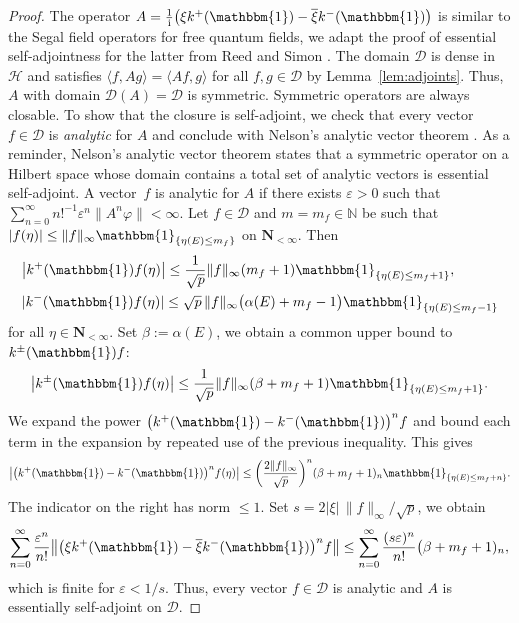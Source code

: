 \documentclass[10pt,a4paper]{amsart}
\numberwithin{equation}{section}
\newcommand{\N}{\mathbb{N}}
\newcommand{\eps}{\varepsilon}
\newcommand{\la}{\langle}
\newcommand{\ra}{\rangle}
\newcommand{\1}{\mathbbm{1}}
\begin{document}
\begin{proof}
	The operator $A = \frac{1}{\mathrm i} \bigl( \xi k^+(\1)- \overline{\xi} k^-(\1)\bigr)$ is similar to the Segal field operators for free quantum fields, we adapt the proof of essential self-adjointness for the latter from Reed and Simon \cite[Theorem X.41\,(a)]{reedSimonII}.
	The domain $\mathcal D$ is dense in $\mathcal H$ and satisfies $\la f, A g\ra = \la Af, g\ra$ for all $f,g\in \mathcal D$ by Lemma~\ref{lem:adjoints}. Thus, $A$ with domain $\mathcal D(A) = \mathcal D$ is symmetric. Symmetric operators are always closable. 	
	To show that the closure is self-adjoint, we check that every vector $f\in \mathcal D$ is \emph{analytic} for $A$ and conclude with Nelson's analytic vector theorem \cite[Theorem~X.39]{reedSimonII}.
 As a reminder, Nelson's analytic vector theorem states that a symmetric operator on a Hilbert space whose domain contains a total set of analytic vectors is essential self-adjoint.
 A vector~$f$ is analytic for $A$ if there exists $\eps>0$ such that $\sum_{n=0}^\infty n!^{-1} \eps^n \| A^n \varphi\|<\infty$.
	Let $f\in \mathcal D$ and $m=m_f\in \N$ be such that $|f(\eta)|\leq \|f\|_\infty \1_{\{\eta(E)\leq m_f\}}$ on $\mathbf N_{<\infty}$. Then
	\begin{align*}
		&\bigl| k^+(\1) f(\eta)\bigr| \leq \frac{1}{\sqrt p} \|f\|_\infty (m_f+1) \1_{\{\eta(E) \leq m_f+1\}},\\
		&| k^-(\1) f(\eta)| \leq \sqrt p\, \|f\|_\infty \bigl(\alpha(E)+m_f-1\bigr) \1_{\{\eta(E) \leq m_f-1\}}
	\end{align*} 	
	for all $\eta \in \mathbf N_{<\infty}$. Set $\beta:= \alpha(E)$, we obtain a common upper bound to $k^\pm(\1) f$:
	\[
		\bigl| k^\pm(\1) f(\eta)\bigr| \leq \frac{1}{\sqrt p} \|f\|_\infty (\beta +m_f+1) \1_{\{\eta(E) \leq m_f + 1\}}.
	\]
	We expand the power $\bigl(k^+(\1) - k^-(\1)\bigr)^n f$ and bound each term in the expansion by repeated use of the previous inequality. This gives
	\[
		\bigl| \bigl(k^+(\1) - k^-(\1)\bigr)^n f(\eta)\bigr| \leq \biggl(\frac{ 2 \| f\|_\infty}{\sqrt p}\biggr)^{n} ( \beta + m_f + 1)_n \1_{\{\eta(E)\leq m_f+n\}}.
	\] 	
	The indicator on the right has norm $\leq 1$. Set $s = 2|\xi|\, \|f\|_\infty/\sqrt p$, we obtain
	\[
		\sum_{n=0}^\infty \frac{\eps^n}{n!} \bigl\| \bigl(\xi k^+(\1) -\overline{\xi} k^-(\1)\bigr)^n f \bigr\|
			 \leq \sum_{n=0}^\infty \frac{(s\eps)^n}{n!} \bigl(\beta + m_f + 1)_n,
	\] 	
	which is finite for $\eps< 1/s$. Thus, every vector $f\in \mathcal D$ is analytic and $A$ is essentially self-adjoint on $\mathcal D$. 		
\end{proof}
\end{document}
